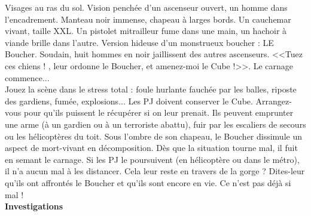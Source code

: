 \documentclass[11pt,twoside,a4paper]{book}
\begin{document}
\clearpage

Visages au ras du sol. Vision pench{\'e}e d'un ascenseur ouvert, un homme dans l'encadrement. Manteau noir immense, chapeau {\`a} larges bords. Un cauchemar vivant, taille XXL. Un pistolet mitrailleur fume dans une main, un hachoir {\`a} viande brille dans l'autre. Version hideuse d'un monstrueux boucher : LE Boucher. Soudain, huit hommes en noir jaillissent des autres ascenseurs. <<Tuez ces chiens ! , leur ordonne le Boucher, et amenez-moi le Cube !>>. Le carnage commence...~\\

Jouez la sc{\`e}ne dans le stress total : foule hurlante fauch{\'e}e par les balles, riposte des gardiens, fum{\'e}e, explosions... Les PJ doivent conserver le Cube. Arrangez-vous pour qu'ils puissent le r{\'e}cup{\'e}rer si on leur prenait. Ils peuvent emprunter une arme ({\`a} un gardien ou {\`a} un terroriste abattu), fuir par les escaliers de secours ou les h{\'e}licopt{\`e}res du toit. Sous l'ombre de son chapeau, le Boucher dissimule un aspect de mort-vivant en d{\'e}composition. D{\`e}s que la situation tourne mal, il fuit en semant le carnage. Si les PJ le poursuivent (en h{\'e}licopt{\`e}re ou dans le m{\'e}tro), il n'a aucun mal {\`a} les distancer. Cela leur reste en travers de la gorge ? Dites-leur qu'ils ont affront{\'e}s le Boucher et qu'ils sont encore en vie. Ce n'est pas d{\'e}j{\`a} si mal !~\\

\textbf{\large Investigations}~\\
\end{document}

